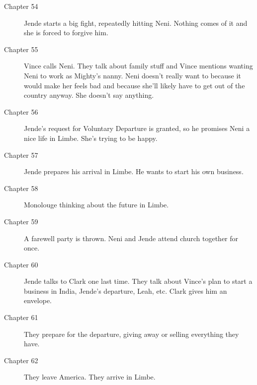 \documentclass{article}
\begin{document}
\begin{description}
 \item[Chapter 54] Jende starts a big fight, repeatedly hitting Neni. Nothing comes of it and she is forced to forgive him.
 \item[Chapter 55] Vince calls Neni. They talk about family stuff and Vince mentions wanting Neni to work as Mighty's nanny. Neni doesn't really want to because it would make her feels bad and because she'll likely have to get out of the country anyway. She doesn't say anything.
 \item[Chapter 56] Jende's request for Voluntary Departure is granted, so he promises Neni a nice life in Limbe. She's trying to be happy.
 \item[Chapter 57] Jende prepares his arrival in Limbe. He wants to start his own business.
 \item[Chapter 58] Monolouge thinking about the future in Limbe.
 \item[Chapter 59] A farewell party is thrown. Neni and Jende attend church together for once.
 \item[Chapter 60] Jende talks to Clark one last time. They talk about Vince's plan to start a business in India, Jende's departure, Leah, etc. Clark gives him an envelope.
 \item[Chapter 61] They prepare for the departure, giving away or selling everything they have.
 \item[Chapter 62] They leave America. They arrive in Limbe.
\end{description}
\end{document}
